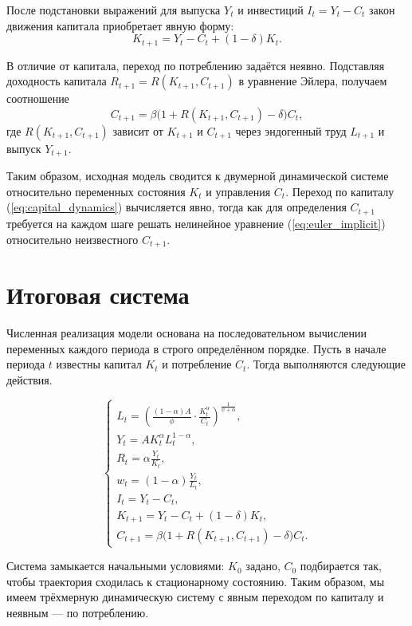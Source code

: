 После подстановки выражений для выпуска $Y_t$ и инвестиций $I_t = Y_t - C_t$ закон движения капитала приобретает явную форму:
\begin{equation}
K_{t+1} = Y_t - C_t + (1-\delta)K_t. \label{eq:capital_dynamics}
\end{equation}

В отличие от капитала, переход по потреблению задаётся неявно. Подставляя доходность капитала $R_{t+1} = R(K_{t+1}, C_{t+1})$ в уравнение Эйлера, получаем соотношение
\begin{equation}
C_{t+1} = \beta \bigl(1 + R(K_{t+1}, C_{t+1}) - \delta \bigr) C_t, \label{eq:euler_implicit}
\end{equation}
где $R(K_{t+1}, C_{t+1})$ зависит от $K_{t+1}$ и $C_{t+1}$ через эндогенный труд $L_{t+1}$ и выпуск $Y_{t+1}$.

Таким образом, исходная модель сводится к двумерной динамической системе относительно переменных состояния $K_t$ и управления $C_t$. Переход по капиталу (\ref{eq:capital_dynamics}) вычисляется явно, тогда как для определения $C_{t+1}$ требуется на каждом шаге решать нелинейное уравнение (\ref{eq:euler_implicit}) относительно неизвестного $C_{t+1}$.

\section{Итоговая система}

Численная реализация модели основана на последовательном вычислении переменных каждого периода в строго определённом порядке. Пусть в начале периода $t$ известны капитал $K_t$ и потребление $C_t$. Тогда выполняются следующие действия.

\begin{equation}
\begin{cases}
L_t = \left( \frac{(1-\alpha)A}{\phi} \cdot \frac{K_t^{\alpha}}{C_t} \right)^{\frac{1}{\psi+\alpha}}, \\[4pt]
Y_t = A K_t^{\alpha} L_t^{1-\alpha}, \\[4pt]
R_t = \alpha \frac{Y_t}{K_t}, \\[4pt]
w_t = (1-\alpha) \frac{Y_t}{L_t}, \\[4pt]
I_t = Y_t - C_t, \\[4pt]
K_{t+1} = Y_t - C_t + (1-\delta) K_t, \\[4pt]
C_{t+1} = \beta \bigl(1 + R(K_{t+1}, C_{t+1}) - \delta \bigr) C_t.
\end{cases}
\end{equation}

Система замыкается начальными условиями: $K_0$ задано, $C_0$ подбирается так, чтобы траектория сходилась к стационарному состоянию. Таким образом, мы имеем трёхмерную динамическую систему с явным переходом по капиталу и неявным — по потреблению.